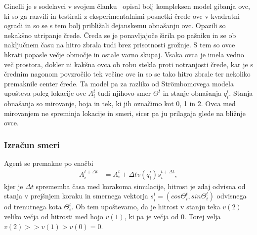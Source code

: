 Ginelli je s sodelavci v svojem članku~\cite{Ginelli} opisal bolj kompleksen model gibanja ovc, ki so ga razvili in testirali z eksperimentalnimi posnetki črede ovc v kvadratni ogradi in so se s tem bolj približali dejanskemu obnašanju ovc. Opazili so nekakšno utripanje črede. Čreda se je ponavljajoče širila po pašniku in se ob naključnem času na hitro zbrala tudi brez prisotnosti grožnje. S tem so ovce hkrati popasle večje območje in ostale varno skupaj. Vsaka ovca je imela vedno več prostora, dokler ni kakšna ovca ob robu stekla proti notranjosti črede, kar je s črednim nagonom povzročilo tek večine ovc in so se tako hitro zbrale ter nekoliko premaknile center črede. Ta model pa za razliko od Str{\"o}mbomovega modela upošteva poleg lokacije ovc $A_i^t$ tudi njihovo smer $\Theta^t$ in stanje obnašanja $q_i^t$. Stanja obnašanja so mirovanje, hoja in tek, ki jih označimo kot 0, 1 in 2. Ovca med mirovanjem ne spreminja lokacije in smeri, sicer pa ju prilagaja glede na bližnje ovce.

\subsubsection{Izračun smeri}

Agent se premakne po enačbi
\begin{align}
A_i^{t+\Delta t} &= A_i^t + \Delta tv(q_i^t)s_i^{t+\Delta t}, \label{eq:ginelli-premik}
\end{align}
kjer je $\Delta t$ sprememba časa med korakoma simulacije, hitrost je zdaj odvisna od stanja v prejšnjem koraku in smernega vektorja $s_i^t = (cos\Theta_i^t, sin\Theta_i^t)$ odvisnega od trenutnega kota $\Theta_i^t$. Ob tem upoštevamo, da je hitrost v stanju teka $v(2)$ veliko večja od hitrosti med hojo $v(1)$, ki pa je večja od 0. Torej velja $v(2) >> v(1) > v(0) = 0$.

